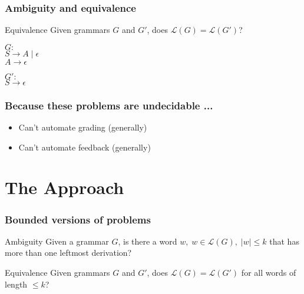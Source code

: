 \documentclass{beamer}
\begin{document}
\begin{frame}
\frametitle{Ambiguity and equivalence}
\begin{block}{Equivalence}
Given grammars $G$ and $G'$, does $\mathcal{L}(G) = \mathcal{L}(G')$? 
\end{block}

\pause 
\vspace{0.2in}
$G:$\\
\hspace*{10pt} $S \rightarrow  A \; | \; \epsilon$\\
\hspace*{10pt} $A \rightarrow   \epsilon$

\vspace{0.2in}
$G':$\\
\hspace*{10pt} $S \rightarrow \epsilon$
\end{frame}

\begin{frame}
\frametitle{Because these problems are undecidable ...}
\begin{itemize}
\item Can't automate grading (generally)
\vspace{0.1in}
\item Can't automate feedback (generally)
\end{itemize}
\end{frame}



\section{The Approach}

\begin{frame}
\frametitle {Bounded versions of problems}

\begin{block}{Ambiguity}
Given a grammar $G$, is there a word $w, \; w \in \mathcal{L}(G) , \; |w| \leq k$ that has more than one leftmost derivation?
\end{block}

\vspace{0.2in}

\begin{block}{Equivalence}
Given grammars $G$ and $G'$, does $\mathcal{L}(G) = \mathcal{L}(G')$ for all words of length $\leq k$? 
\end{block}

\end{frame}
\end{document}

